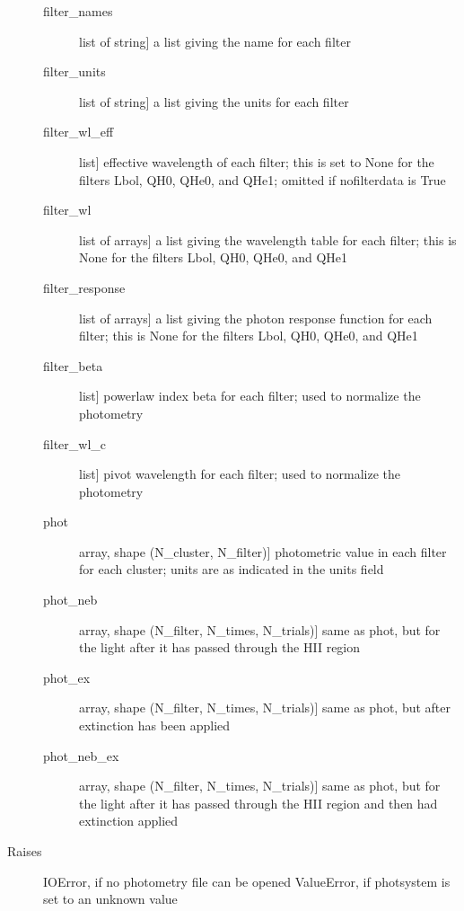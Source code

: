 \documentclass[letterpaper,10pt,english]{sphinxmanual}
\begin{document}
\begin{fulllineitems}
\begin{description}
\begin{description}
\item[{filter\_names}] \leavevmode{[}list of string{]}
a list giving the name for each filter

\item[{filter\_units}] \leavevmode{[}list of string{]}
a list giving the units for each filter

\item[{filter\_wl\_eff}] \leavevmode{[}list{]}
effective wavelength of each filter; this is set to None for the
filters Lbol, QH0, QHe0, and QHe1; omitted if nofilterdata is
True

\item[{filter\_wl}] \leavevmode{[}list of arrays{]}
a list giving the wavelength table for each filter; this is
None for the filters Lbol, QH0, QHe0, and QHe1

\item[{filter\_response}] \leavevmode{[}list of arrays{]}
a list giving the photon response function for each filter;
this is None for the filters Lbol, QH0, QHe0, and QHe1

\item[{filter\_beta}] \leavevmode{[}list{]}
powerlaw index beta for each filter; used to normalize the
photometry

\item[{filter\_wl\_c}] \leavevmode{[}list{]}
pivot wavelength for each filter; used to normalize the photometry

\item[{phot}] \leavevmode{[}array, shape (N\_cluster, N\_filter){]}
photometric value in each filter for each cluster; units are as
indicated in the units field

\item[{phot\_neb}] \leavevmode{[}array, shape (N\_filter, N\_times, N\_trials){]}
same as phot, but for the light after it has passed through
the HII region

\item[{phot\_ex}] \leavevmode{[}array, shape (N\_filter, N\_times, N\_trials){]}
same as phot, but after extinction has been applied

\item[{phot\_neb\_ex}] \leavevmode{[}array, shape (N\_filter, N\_times, N\_trials){]}
same as phot, but for the light after it has passed through
the HII region and then had extinction applied

\end{description}

\item[{Raises}] \leavevmode
IOError, if no photometry file can be opened
ValueError, if photsystem is set to an unknown value

\end{description}

\end{fulllineitems}
\end{document}
